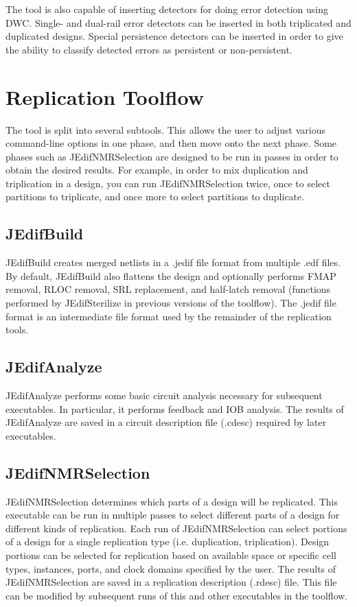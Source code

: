 \documentclass[english]{article}
\numberwithin{figure}{section}
\begin{document}
The tool is also capable of inserting detectors for doing error detection using
DWC. Single- and dual-rail error detectors can be inserted in both triplicated
and duplicated designs. Special persistence detectors can be inserted in order
to give the ability to classify detected errors as persistent or non-persistent.

\section{Replication Toolflow}
The tool is split into several subtools. This allows the user to
adjust various command-line options in one phase, and then move onto
the next phase. Some phases such as JEdifNMRSelection are designed to be run in
passes in order to obtain the desired results. For example, in order to mix
duplication and triplication in a design, you can run JEdifNMRSelection twice,
once to select partitions to triplicate, and once more to select partitions to
duplicate.

\subsection{JEdifBuild}
JEdifBuild creates merged netlists in a .jedif file format from
multiple .edf files. By default, JEdifBuild also flattens the design
and optionally performs FMAP removal, RLOC removal, SRL replacement,
and half-latch removal (functions performed by JEdifSterilize in
previous versions of the toolflow). The .jedif file format is an
intermediate file format used by the remainder of the replication
tools.

\subsection{JEdifAnalyze}
JEdifAnalyze performs some basic circuit analysis necessary for
subsequent executables. In particular, it performs feedback and IOB
analysis. The results of JEdifAnalyze are saved in a circuit
description file (.cdesc) required by later executables.

\subsection{JEdifNMRSelection}
JEdifNMRSelection determines which parts of a design will be
replicated. This executable can be run in multiple passes to select
different parts of a design for different kinds of replication. Each
run of JEdifNMRSelection can select portions of a design for a single
replication type (i.e. duplication, triplication). Design portions can
be selected for replication based on available space or specific cell
types, instances, ports, and clock domains specified by the user. The
results of JEdifNMRSelection are saved in a replication description
(.rdesc) file. This file can be modified by subsequent runs of this
and other executables in the toolflow.
\end{document}
